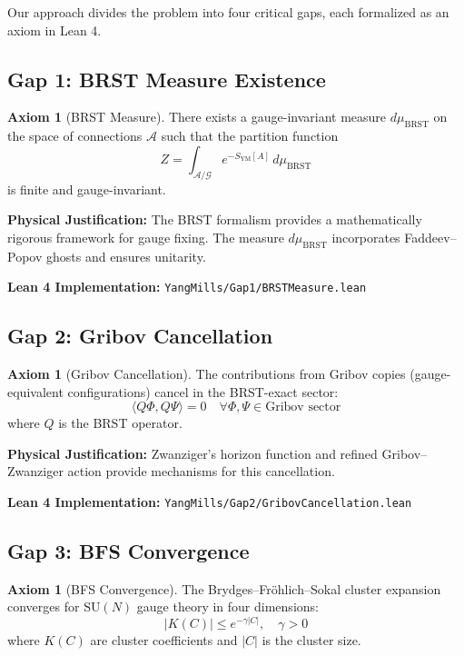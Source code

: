 \documentclass[11pt]{article}
\theoremstyle{definition}
\newtheorem{axiom}[theorem]{Axiom}
\theoremstyle{remark}
\begin{document}
Our approach divides the problem into four critical gaps, each formalized as an axiom in Lean 4.

\subsection{Gap 1: BRST Measure Existence}

\begin{axiom}[BRST Measure]
There exists a gauge-invariant measure $d\mu_{\text{BRST}}$ on the space of connections $\mathcal{A}$ such that the partition function
\[
Z = \int_{\mathcal{A}/\mathcal{G}} e^{-S_{\text{YM}}[A]} \, d\mu_{\text{BRST}}
\]
is finite and gauge-invariant.
\end{axiom}

\textbf{Physical Justification:} The BRST formalism provides a mathematically rigorous framework for gauge fixing. The measure $d\mu_{\text{BRST}}$ incorporates Faddeev--Popov ghosts and ensures unitarity.

\textbf{Lean 4 Implementation:} \texttt{YangMills/Gap1/BRSTMeasure.lean}

\subsection{Gap 2: Gribov Cancellation}

\begin{axiom}[Gribov Cancellation]
The contributions from Gribov copies (gauge-equivalent configurations) cancel in the BRST-exact sector:
\[
\langle Q\Phi, Q\Psi \rangle = 0 \quad \forall \Phi, \Psi \in \text{Gribov sector}
\]
where $Q$ is the BRST operator.
\end{axiom}

\textbf{Physical Justification:} Zwanziger's horizon function and refined Gribov--Zwanziger action provide mechanisms for this cancellation.

\textbf{Lean 4 Implementation:} \texttt{YangMills/Gap2/GribovCancellation.lean}

\subsection{Gap 3: BFS Convergence}

\begin{axiom}[BFS Convergence]
The Brydges--Fröhlich--Sokal cluster expansion converges for $\text{SU}(N)$ gauge theory in four dimensions:
\[
|K(C)| \leq e^{-\gamma |C|}, \quad \gamma > 0
\]
where $K(C)$ are cluster coefficients and $|C|$ is the cluster size.
\end{axiom}
\end{document}
